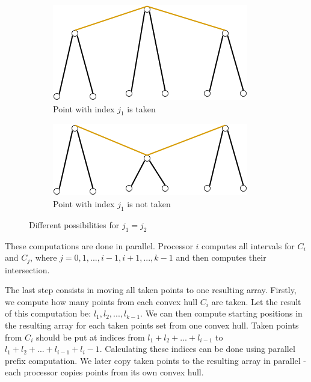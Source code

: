 \documentclass[letterpaper]{article}
\theoremstyle{definition}
\begin{document}
\begin{figure}
\centering
\begin{subfigure}{.3\textwidth}
	\centering
	\includegraphics[width=\linewidth]{img/simple-parallel-taking}
	\caption{Point with index $j_1$ is taken}
\end{subfigure}
\begin{subfigure}{.3\textwidth}
	\centering
	\includegraphics[width=\linewidth]{img/simple-parallel-not-taking}
	\caption{Point with index $j_1$ is not taken}
\end{subfigure}
\caption{Different possibilities for $j_1 = j_2$}
\label{fig:simple-parallel}
\end{figure}

These computations are done in parallel.
Processor $i$ computes all intervals for $C_i$ and $C_j$, where $j = 0, 1, ..., i -1, i+ 1, ..., k - 1$ and then computes their intersection.

The last step consists in moving all taken points to one resulting array.
Firstly, we compute how many points from each convex hull $C_i$ are taken.
Let the result of this computation be: $l_1, l_2, ..., l_{k-1}$.
We can then compute starting positions in the resulting array for each taken points set from one convex hull.
Taken points from $C_i$ should be put at indices from $l_1 + l_2 + ... + l_{i-1}$ to $l_1 + l_2 + ... + l_{i-1} + l_i - 1$.
Calculating these indices can be done using parallel prefix computation.
We later copy taken points to the resulting array in parallel - each processor copies points from its own convex hull.
\end{document}

